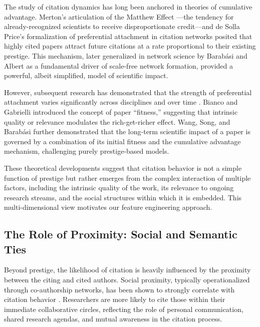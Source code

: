 \documentclass[12pt,a4paper]{article}
\begin{document}
The study of citation dynamics has long been anchored in theories of cumulative advantage. Merton's articulation of the Matthew Effect \citep{merton1968matthew}---the tendency for already-recognized scientists to receive disproportionate credit---and de Solla Price's formalization of preferential attachment in citation networks \citep{de1976general} posited that highly cited papers attract future citations at a rate proportional to their existing prestige. This mechanism, later generalized in network science by Barab\'asi and Albert \citep{barabasi1999emergence} as a fundamental driver of scale-free network formation, provided a powerful, albeit simplified, model of scientific impact.

However, subsequent research has demonstrated that the strength of preferential attachment varies significantly across disciplines and over time \citep{wang2008measuring}. Bianco and Gabrielli \citep{bianco2008fitness} introduced the concept of paper ``fitness,'' suggesting that intrinsic quality or relevance modulates the rich-get-richer effect. Wang, Song, and Barab\'asi \citep{wang2013quantifying} further demonstrated that the long-term scientific impact of a paper is governed by a combination of its initial fitness and the cumulative advantage mechanism, challenging purely prestige-based models.

These theoretical developments suggest that citation behavior is not a simple function of prestige but rather emerges from the complex interaction of multiple factors, including the intrinsic quality of the work, its relevance to ongoing research streams, and the social structures within which it is embedded. This multi-dimensional view motivates our feature engineering approach.

\subsection{The Role of Proximity: Social and Semantic Ties}

Beyond prestige, the likelihood of citation is heavily influenced by the proximity between the citing and cited authors. Social proximity, typically operationalized through co-authorship networks, has been shown to strongly correlate with citation behavior \citep{newman2004coauthorship, kumar2015co, martin2013coauthorship}. Researchers are more likely to cite those within their immediate collaborative circles, reflecting the role of personal communication, shared research agendas, and mutual awareness in the citation process.
\end{document}
